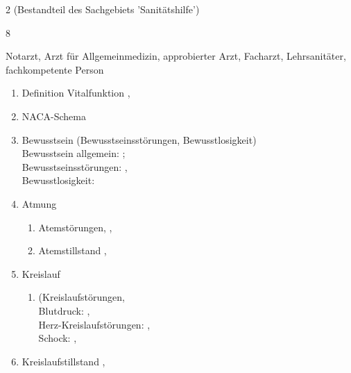 \begin{WidePar}
\begin{multicols}{2}
  (Bestandteil des  Sachgebiets  'Sanitätshilfe')
  
  \begin{inparadesc}
    \item[Stundenanzahl:]  8
    \item[Lehrkraft:]  Notarzt, Arzt für Allgemeinmedizin, approbierter Arzt,
    Facharzt,  Lehrsanitäter,  fachkompetente Person
  \end{inparadesc}
  
  \begin{enumerate}\item
    
    Definition Vitalfunktion \dotfill {},
    \item    NACA-Schema \dotfill {}
    \item    Bewusstsein (Bewusstseinsstörungen, Bewusstlosigkeit)
    \\
    \noindent Bewusstsein
    allgemein:  \dotfill {};
    \\
    Bewusstseinsstörungen: \dotfill
    ,
    \\
    Bewusstlosigkeit: \dotfill  {}
    \item
    Atmung
    \begin{enumerate}
      \item      Atemstörungen, \dotfill {},
      \item      Atemstillstand \dotfill {},
    \end{enumerate}
    \item    Kreislauf
    \begin{enumerate}
      \item      (Kreislaufstörungen,
      \\
      Blutdruck:  \dotfill {},\\
      Herz-Kreislaufstörungen: \dotfill
      ,\\
      Schock: \dotfill
      , 
    \end{enumerate}
    \item    Kreislaufstillstand \dotfill  {},

\end{enumerate}
\end{multicols}
\end{WidePar}
